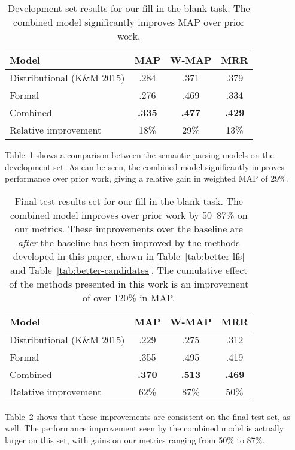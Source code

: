 \documentclass[11pt,letterpaper]{article}
\newcommand{\tabref}[1]{Table~\ref{tab:#1}}
\begin{document}
\begin{table}
  \centering
  {\small
    \begin{tabular}{lccc}
      \toprule
      Model & MAP & W-MAP & MRR \\
      \midrule
      Distributional (K\&M 2015) & .284 & .371 & .379 \\
      Formal & .276 & .469 & .334 \\
      Combined & \textbf{.335} & \textbf{.477} & \textbf{.429} \\
      \midrule
      Relative improvement & 18\% & 29\% & 13\% \\
      \bottomrule
    \end{tabular}
  }
  \caption{Development set results for our fill-in-the-blank task.  The combined model
  significantly improves MAP over prior work.}
  \label{tab:dev-results}
\end{table}

\tabref{dev-results} shows a comparison between the semantic parsing models on the development set.
As can be seen, the combined model significantly improves performance over prior work, giving a
relative gain in weighted MAP of 29\%.

\begin{table}
  \centering
  {\small
    \begin{tabular}{lccc}
      \toprule
      Model & MAP & W-MAP & MRR \\
      \midrule
      Distributional (K\&M 2015) & .229 & .275 & .312 \\
      Formal & .355 & .495 & .419 \\
      Combined & \textbf{.370} & \textbf{.513} & \textbf{.469} \\
      \midrule
      Relative improvement & 62\% & 87\% & 50\% \\
      \bottomrule
    \end{tabular}
  }
  \caption{Final test results set for our fill-in-the-blank task.  The combined model improves over
  prior work by 50--87\% on our metrics.  These improvements over the baseline are \emph{after} the
  baseline has been improved by the methods developed in this paper, shown in \tabref{better-lfs}
  and \tabref{better-candidates}.  The cumulative effect of the methods presented in this work is
  an improvement of over 120\% in MAP.}
  \label{tab:final-results}
\end{table}

\tabref{final-results} shows that these improvements are consistent on the final test set, as well.
The performance improvement seen by the combined model is actually larger on this set, with gains
on our metrics ranging from 50\% to 87\%.
\end{document}
